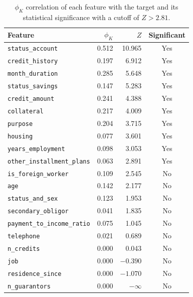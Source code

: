\documentclass{ieeeaccess}
\begin{document}
\begin{table}[htbp]
  \caption{$\phi_K$ correlation of each feature with the target and its statistical significance with a cutoff of $Z > 2.81$.}
  \label{tab:phik}
  \centering
  \begin{tabular}{lrrc}
    \toprule
    Feature & $\phi_K$ & $Z$ & Significant \\
    \midrule
    \texttt{status\_account}           & 0.512 & 10.965       & Yes \\
    \texttt{credit\_history}           & 0.197 & 6.912        & Yes \\
    \texttt{month\_duration}           & 0.285 & 5.648        & Yes \\
    \texttt{status\_savings}           & 0.147 & 5.283        & Yes \\
    \texttt{credit\_amount}            & 0.241 & 4.388        & Yes \\
    \texttt{collateral}                & 0.217 & 4.009        & Yes \\
    \texttt{purpose}                   & 0.204 & 3.715        & Yes \\
    \texttt{housing}                   & 0.077 & 3.601        & Yes \\
    \texttt{years\_employment}         & 0.098 & 3.053        & Yes \\
    \texttt{other\_installment\_plans} & 0.063 & 2.891        & Yes \\
    \texttt{is\_foreign\_worker}       & 0.109 & 2.545        & No  \\
    \texttt{age}                       & 0.142 & 2.177        & No  \\
    \texttt{status\_and\_sex}          & 0.123 & 1.953        & No  \\
    \texttt{secondary\_obligor}        & 0.041 & 1.835        & No  \\
    \texttt{payment\_to\_income\_ratio}& 0.075 & 1.045        & No  \\
    \texttt{telephone}                 & 0.021 & 0.689        & No  \\
    \texttt{n\_credits}                & 0.000 & 0.043        & No  \\
    \texttt{job}                       & 0.000 & $-0.390$     & No  \\
    \texttt{residence\_since}          & 0.000 & $-1.070$     & No  \\
    \texttt{n\_guarantors}             & 0.000 & $-\infty$    & No  \\
    \bottomrule
  \end{tabular}
\end{table}
\end{document}
